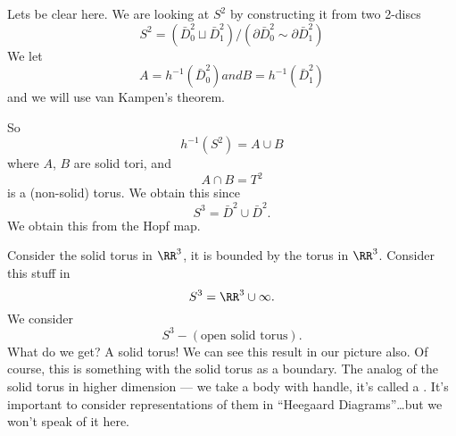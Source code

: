 Lets be clear here. We are looking at $S^{2}$ by constructing it
from two 2-discs 
\begin{equation}
S^{2}=(\bar{D}^{2}_{0}\sqcup\bar{D}^{2}_{1})/(\partial\bar{D}^{2}_{0}\sim\partial\bar{D}^{2}_{1})
\end{equation}
We let
\begin{subequations}
\begin{equation}
A=h^{-1}(\bar{D}^{2}_{0})
\end{equation}
and
\begin{equation}
B=h^{-1}(\bar{D}^{2}_{1})
\end{equation}
\end{subequations}
and we will use van Kampen's theorem.

So
\begin{equation}
h^{-1}(S^{2})=A\cup B
\end{equation}
where $A$, $B$ are solid tori, and
\begin{equation}
A\cap B=T^{2}
\end{equation}
is a (non-solid) torus. We obtain this since
\begin{equation}
S^{3}=\bar{D}^{2}\cup\bar{D}^{2}.
\end{equation}
We obtain this from the Hopf map.

Consider the solid torus in $\RR^3$, it is bounded by the torus
in $\RR^3$. Consider this stuff in
\begin{equation}
S^{3}=\RR^{3}\cup\infty.
\end{equation}
We consider
\begin{equation}
S^{3}-(\mbox{open solid torus}).
\end{equation}
What do we get? A solid torus! We can see this result in our
picture also. Of course, this is something with the solid torus
as a boundary. The analog of the solid torus in higher dimension
--- we take a body with handle, it's called a .
It's important to consider representations of them in ``Heegaard
Diagrams''\dots but
we won't speak of it here.

